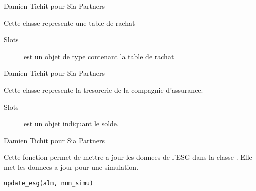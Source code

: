\documentclass[a4paper]{book}
\begin{document}
%
\begin{Author}\relax
Damien Tichit pour Sia Partners
\end{Author}
%
\begin{Description}\relax
Cette classe represente une table de rachat
\end{Description}
%
\begin{Section}{Slots}

\begin{description}

\item[] est un objet de type  contenant la table de rachat

\end{description}
\end{Section}
%
\begin{Author}\relax
Damien Tichit pour Sia Partners
\end{Author}
%
\begin{Description}\relax
Cette classe represente la tresorerie de la compagnie d'assurance.
\end{Description}
%
\begin{Section}{Slots}

\begin{description}

\item[] est un objet  indiquant le solde.

\end{description}
\end{Section}
%
\begin{Author}\relax
Damien Tichit pour Sia Partners
\end{Author}
%
\begin{Description}\relax
Cette fonction permet de mettre a jour les donnees de l'ESG dans la classe .
Elle met les donnees a jour pour une simulation.
\end{Description}
%
\begin{Usage}
\begin{verbatim}
update_esg(alm, num_simu)
\end{verbatim}
\end{Usage}
\end{document}
